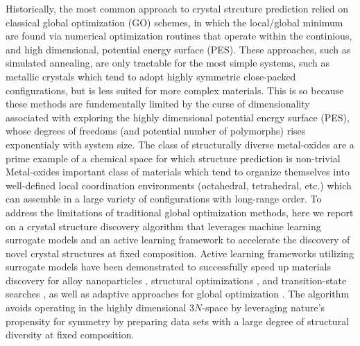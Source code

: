 %
Historically, the most common approach to crystal strcuture prediction relied on classical global optimization (GO) schemes,
in which the local/global minimum are found via numerical optimization routines that operate within the continious, and high dimensional, potential energy surface (PES).
%
These approaches, such as simulated annealing, are only tractable for the most simple systems,
such as metallic crystals which tend to adopt highly symmetric close-packed configurations, but is less suited for more complex materials.
%
This is so because these methods are fundementally limited by the curse of dimensionality associated with exploring the highly dimensional potential energy surface (PES),
whose degrees of freedoms (and potential number of polymorphs) rises exponentialy with system size.\cite{Stillinger1999}
%
The class of structurally diverse metal-oxides are a prime example of a chemical space for which structure prediction is non-trivial
%
Metal-oxides important class of materials which tend to organize themselves into well-defined local coordination environments (octahedral, tetrahedral, etc.) which can assemble in a large variety of configurations with long-range order.
%
To address the limitations of traditional global optimization methods,
here we report on a crystal structure discovery algorithm that leverages machine learning surrogate models and an active learning framework to accelerate the discovery of novel crystal structures at fixed composition.
%
Active learning frameworks utilizing surrogate models have been demonstrated to successfully speed up materials discovery for alloy nanoparticles \cite{Jennings2019}, structural optimizations \cite{hansen2019atomistic}, and transition-state searches \cite{torres2019low}, as well as adaptive approaches for global optimization \cite{VanDenBossche2018}.
%
The algorithm avoids operating in the highly dimensional $3N$-space by leveraging nature's propensity for symmetry by preparing data sets with a large degree of structural diversity at fixed composition.
